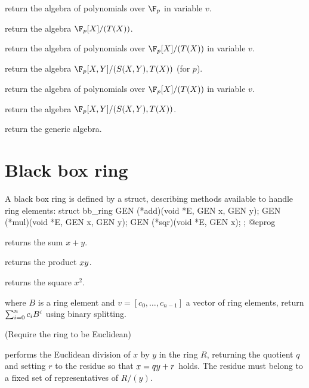 
return the algebra of polynomials over $\F_p$ in variable $v$.

return the algebra $\F_p[X]/(T(X))$.

return the algebra of polynomials over $\F_p[X]/(T(X))$ in variable $v$.

return the algebra $\F_p[X,Y]/(S(X,Y),T(X))$ (for  $p$).

return the algebra of polynomials over $\F_p[X]/(T(X))$ in variable $v$.

return the algebra $\F_p[X,Y]/(S(X,Y),T(X))$.

return the generic algebra.

\section{Black box ring}

A black box ring is defined by a  struct, describing methods
available to handle ring elements:
\bprog
struct bb_ring
{
  GEN (*add)(void *E, GEN x, GEN y);
  GEN (*mul)(void *E, GEN x, GEN y);
  GEN (*sqr)(void *E, GEN x);
};
@eprog

 returns the sum $x+y$.

 returns the product $x\*y$.

 returns the square $x^2$.

where $B$ is a ring element and $v=[c_0,\ldots,c_{n-1}]$ a vector of ring elements,
return $\sum_{i=0}^n c_i\*B^i$ using binary splitting.


(Require the ring to be Euclidean)

 performs the Euclidean division of $x$ by $y$ in the ring
$R$, returning the quotient $q$ and setting $r$ to the residue so that
$x=q\*y+r$ holds. The residue must belong to a fixed set of representatives of
$R/(y)$.

